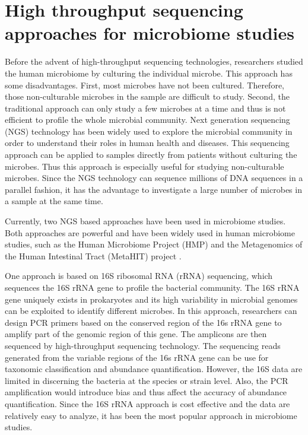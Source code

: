 \section{High throughput sequencing approaches for microbiome studies}
Before the advent of high-throughput sequencing technologies, researchers studied the human microbiome by culturing the individual microbe. This approach has some disadvantages. First, most microbes have not been cultured. Therefore, those non-culturable microbes in the sample are difficult to study. Second, the traditional approach can only study a few microbes at a time and thus is not efficient to profile the whole microbial community. Next generation sequencing (NGS) technology has been widely used to explore the microbial community in order to understand their roles in human health and diseases. This sequencing approach can be applied to samples directly from patients without culturing the microbes. Thus this approach is especially useful for studying non-culturable microbes. Since the NGS technology can sequence millions of DNA sequences in a parallel fashion, it has the advantage to investigate a large number of microbes in a sample at the same time.


Currently, two NGS based approaches have been used in microbiome studies. Both approaches are powerful and have been widely used in human microbiome studies, such as the Human Microbiome Project (HMP) \citep{turnbaugh2007human} and the Metagenomics of the Human Intestinal Tract (MetaHIT) project \citep{qin2010human}. 

One approach is based on 16S ribosomal RNA (rRNA) sequencing, which sequences the 16S rRNA gene to profile the bacterial community. The 16S rRNA gene uniquely exists in prokaryotes and its high variability in microbial genomes can be exploited to identify different microbes. In this approach, researchers can design PCR primers based on the conserved region of the 16s rRNA gene to amplify part of the genomic region of this gene. The amplicons are then sequenced by high-throughput sequencing technology. The sequencing reads generated from the variable regions of the 16s rRNA gene can be use for taxonomic classification and abundance quantification. However, the 16S data are limited in discerning the bacteria at the species or strain level. Also, the PCR amplification would introduce bias and thus affect the accuracy of abundance quantification. Since the 16S rRNA approach is cost effective and the data are relatively easy to analyze, it has been the most popular approach in microbiome studies. 

